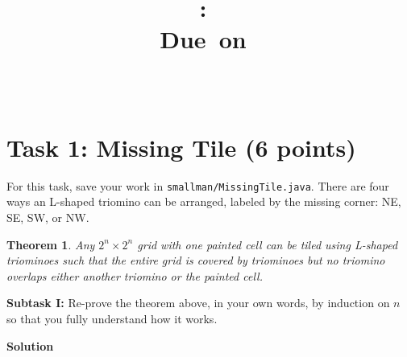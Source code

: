 \documentclass{article}
\title{
    \vspace{2in}
    \textmd{\textbf{\hmwkClass:\ \hmwkTitle}}\\
    \normalsize\vspace{0.1in}\small{Due\ on\ \hmwkDueDate}\\
    \vspace{0.1in}\large{\textit{\hmwkClassInstructor\ \hmwkClassTime}}
    \vspace{3in}
}
\author{\hmwkAuthorName}
\date{}
\newcommand{\solution}{\textbf{\large Solution}}
\newtheorem*{theorem}{Theorem}
\theoremstyle{remark}
\begin{document}
\maketitle
\newpage

\section*{Task 1: Missing Tile (6 points)}

For this task, save your work in \texttt{smallman/MissingTile.java}. There are four ways an L-shaped triomino can be arranged, labeled by the missing corner: NE, SE, SW, or NW.

\begin{theorem}
Any $2^n \times 2^n$ grid with one painted cell can be tiled using L-shaped triominoes such that the entire grid is covered by triominoes but no triomino overlaps either another triomino or the painted cell.
\end{theorem}

\textbf{Subtask I:} Re-prove the theorem above, in your own words, by induction on $n$ so that you fully understand how it works.

\medskip
\solution
\end{document}
